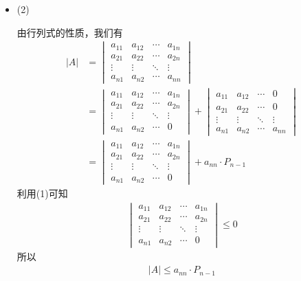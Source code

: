 \documentclass{article}
\begin{document}
\begin{itemize}
  \item (2)

        由行列式的性质，我们有
        \begin{align*}
          |A| & = \begin{vmatrix}
                    a_{11} & a_{12} & \cdots & a_{1n} \\
                    a_{21} & a_{22} & \cdots & a_{2n} \\
                    \vdots & \vdots & \ddots & \vdots \\
                    a_{n1} & a_{n2} & \cdots & a_{nn}
                  \end{vmatrix}                 \\
              & = \begin{vmatrix}
                    a_{11} & a_{12} & \cdots & a_{1n} \\
                    a_{21} & a_{22} & \cdots & a_{2n} \\
                    \vdots & \vdots & \ddots & \vdots \\
                    a_{n1} & a_{n2} & \cdots & 0
                  \end{vmatrix} + \begin{vmatrix}
                                    a_{11} & a_{12} & \cdots & 0      \\
                                    a_{21} & a_{22} & \cdots & 0      \\
                                    \vdots & \vdots & \ddots & \vdots \\
                                    a_{n1} & a_{n2} & \cdots & a_{nn}
                                  \end{vmatrix} \\
              & = \begin{vmatrix}
                    a_{11} & a_{12} & \cdots & a_{1n} \\
                    a_{21} & a_{22} & \cdots & a_{2n} \\
                    \vdots & \vdots & \ddots & \vdots \\
                    a_{n1} & a_{n2} & \cdots & 0
                  \end{vmatrix}
          + a_{nn} \cdot P_{n - 1}
        \end{align*}
        利用(1)可知
        \begin{align*}
          \begin{vmatrix}
            a_{11} & a_{12} & \cdots & a_{1n} \\
            a_{21} & a_{22} & \cdots & a_{2n} \\
            \vdots & \vdots & \ddots & \vdots \\
            a_{n1} & a_{n2} & \cdots & 0
          \end{vmatrix} \leq 0
        \end{align*}
        所以
        \begin{align*}
          |A| \leq a_{nn} \cdot P_{n - 1}
        \end{align*}


\end{itemize}
\end{document}
